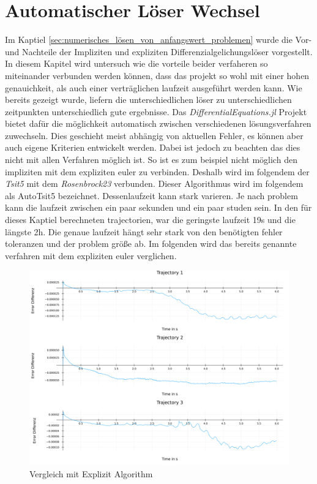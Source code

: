 

\section{Automatischer Löser Wechsel}

Im Kaptiel \ref{sec:numerisches_lösen_von_anfangswert_problemen} wurde die Vor- und Nachteile der Impliziten und expliziten Differenzialgelichungslöser 
vorgestellt.
In diesem Kapitel wird untersuch wie die vorteile beider verfaheren so miteinander verbunden 
werden können, dass das projekt so wohl mit einer hohen genauichkeit, als auch einer verträglichen laufzeit
ausgeführt werden kann.
Wie bereits gezeigt wurde, liefern die unterschiedlichen löser zu unterschiedlichen zeitpunkten
unterschiedlich gute ergebnisse.
Das \textit{DifferentialEquations.jl} Projekt bietet dafür die möglichkeit automatisch 
zwischen verschiedenen lösungsverfahren zuwechseln.
Dies geschieht meist abhängig von aktuellen Fehler, es können aber auch eigene Kriterien entwickelt werden.
Dabei ist jedoch zu beachten das dies nicht mit allen Verfahren möglich ist.
So ist es zum beispiel nicht möglich den impliziten mit dem expliziten euler zu verbinden.
Deshalb wird im folgendem der \textit{Tsit5} mit dem \textit{Rosenbrock23} verbunden. Dieser Algorithmus wird im folgendem als AutoTsit5 bezeichnet.
Dessenlaufzeit kann stark varieren. Je nach problem kann die laufzeit zwischen ein paar sekunden und
ein paar studen sein.
In den für dieses Kaptiel berechneten trajectorien, war die geringste laufzeit 19s und die längste 2h.
Die genaue laufzeit hängt sehr stark von den benötigten fehler toleranzen und der problem größe ab.
Im folgenden wird das bereits genannte verfahren mit dem expliziten euler verglichen.

\begin{figure}[h]
    \centering
    \includegraphics[width=\textwidth]{Data/03_Ergebnisse/autoswitching/errors_explizit_composit.png}
    \caption{Vergleich mit Explizit Algorithm}
    \label{fig:vergleichexplizit}
\end{figure}

